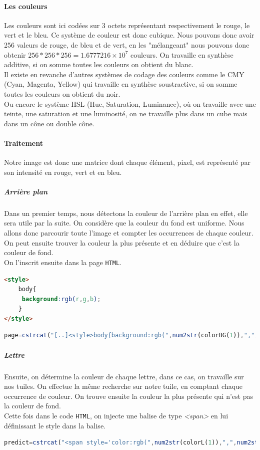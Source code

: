 \documentclass[a4paper,12pt,titlepage]{report}
\begin{document}
	\paragraph{Les couleurs} Les couleurs sont ici codées sur 3 octets représentant respectivement le rouge, le vert et le bleu. Ce système de couleur est donc cubique. Nous pouvons donc avoir 256 valeurs de rouge, de bleu et de vert, en les "mélangeant" nous pouvons donc obtenir $256*256*256=1.6777216\times 10^7$ couleurs. On travaille en synthèse additive, si on somme toutes les couleurs on obtient du blanc.\\
	Il existe en revanche d'autres systèmes de codage des couleurs comme le CMY (Cyan, Magenta, Yellow) qui travaille en synthèse soustractive, si on somme toutes les couleurs on obtient du noir.\\ Ou encore le système HSL (Hue, Saturation, Luminance), où on travaille avec une teinte, une saturation et une luminosité, on ne travaille plus dans un cube mais dans un cône ou double cône.
	\paragraph{Traitement} Notre image est donc une matrice dont chaque élément, pixel, est représenté par son intensité en rouge, vert et en bleu. 
	\subparagraph{Arrière plan} Dans un premier temps, nous détectons la couleur de l'arrière plan en effet, elle sera utile par la suite. On considère que la couleur du fond est uniforme. Nous allons donc parcourir toute l'image et compter les occurrences de chaque couleur. On peut ensuite trouver la couleur la plus présente et en déduire que c'est la couleur de fond.  \\
	On l'inscrit ensuite dans la page \texttt{HTML}.
	\begin{lstlisting}[caption={Style pour le fond},language=HTML]
<style>
	body{
	 background:rgb(r,g,b);	
	}
</style>
\end{lstlisting}
\begin{lstlisting}[caption={Insertion de la couleur de fond dans Octave},language=Octave]
page=cstrcat("[..]<style>body{background:rgb(",num2str(colorBG(1)),",",num2str(colorBG(2)),",",num2str(colorBG(3)),");}</style>[..]");
\end{lstlisting}
	\subparagraph{Lettre} Ensuite, on détermine la couleur de chaque lettre, dans ce cas, on travaille sur nos tuiles. On effectue la même recherche sur notre tuile, en comptant chaque occurrence de couleur. On trouve ensuite la couleur la plus présente qui n'est pas la couleur de fond.\\
	Cette fois dans le code \texttt{HTML}, on injecte une balise de type \textsl{<span>} en lui définissant le style dans la balise.
	\begin{lstlisting}[caption={Insertion de la couleur de la lettre dans Octave},language=Octave]
predict=cstrcat("<span style='color:rgb(",num2str(colorL(1)),",",num2str(colorL(2)),",",num2str(colorL(3)),");'>",predict,"</span>");
\end{lstlisting}
\end{document}
